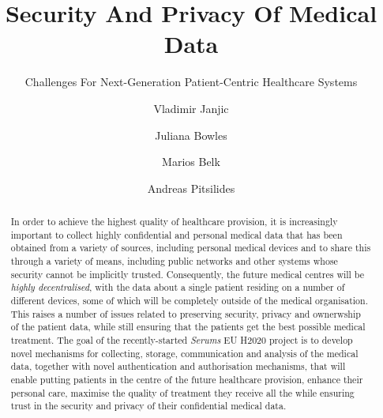 \documentclass[sigconf]{acmart}
\begin{document}
\title{Security And Privacy Of Medical Data}
\subtitle{Challenges For Next-Generation Patient-Centric Healthcare Systems}



\author{Vladimir Janjic}
\author{Juliana Bowles}

\author{Marios Belk}
\author{Andreas Pitsilides}

\renewcommand{\shortauthors}{Janjic, Bowles, Belk and Pitsilides}

%
\begin{abstract}
In order to achieve the highest quality of healthcare provision, it is increasingly important to collect highly confidential and personal medical data that has been obtained from a variety of sources, including personal medical devices and to share this through a variety of means, including public networks and other systems whose security cannot be implicitly trusted. Consequently, the future medical centres will be \emph{highly decentralised}, with the data about a single patient residing on a number of different devices, some of which will be completely outside of the medical organisation. This raises a number of issues related to preserving security, privacy and ownerwship of the patient data, while still ensuring that the patients get the best possible medical treatment. The goal of the recently-started \emph{Serums} EU H2020 project is to develop novel mechanisms for collecting, storage, communication and analysis of the medical data, together with novel authentication and authorisation mechanisms, that will enable putting patients in the centre of the future healthcare provision, enhance their personal care, maximise the quality of treatment they receive all the while ensuring trust in the security and privacy of their confidential medical data. 
\end{abstract}
\end{document}
